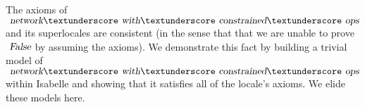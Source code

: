 The axioms of $\isa{network}{\isacharunderscore}\isa{with}{\isacharunderscore}\isa{constrained}{\isacharunderscore}\isa{ops}$ and its superlocales are consistent (in the sense that that we are unable to prove $\isa{False}$ by assuming the axioms).
We demonstrate this fact by building a trivial model of $\isa{network}{\isacharunderscore}\isa{with}{\isacharunderscore}\isa{constrained}{\isacharunderscore}\isa{ops}$ within Isabelle and showing that it satisfies all of the locale's axioms.
We elide these models here.
